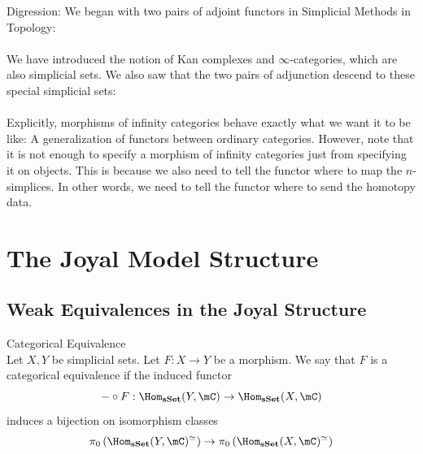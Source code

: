 \documentclass[a4paper]{article}
\begin{document}
Digression: We began with two pairs of adjoint functors in Simplicial Methods in Topology: \\
\\
We have introduced the notion of Kan complexes and $\infty$-categories, which are also simplicial sets. We also saw that the two pairs of adjunction descend to these special simplicial sets: \\
\\

Explicitly, morphisms of infinity categories behave exactly what we want it to be like: A generalization of functors between ordinary categories. However, note that it is not enough to specify a morphism of infinity categories just from specifying it on objects. This is because we also need to tell the functor where to map the $n$-simplices. In other words, we need to tell the functor where to send the homotopy data. 


\pagebreak
\section{The Joyal Model Structure}
\subsection{Weak Equivalences in the Joyal Structure}
\begin{defn}{Categorical Equivalence}{}\\ Let $X,Y$ be simplicial sets. Let $F:X\to Y$ be a morphism. We say that $F$ is a categorical equivalence if the induced functor $$-\circ F:\Hom_\bold{sSet}(Y,\mC)\to\Hom_\bold{sSet}(X,\mC)$$ induces a bijection on isomorphism classes $$\pi_0\left(\Hom_\bold{sSet}(Y,\mC)^\simeq\right)\to\pi_0\left(\Hom_\bold{sSet}(X,\mC)^\simeq\right)$$
\end{defn}
\end{document}

